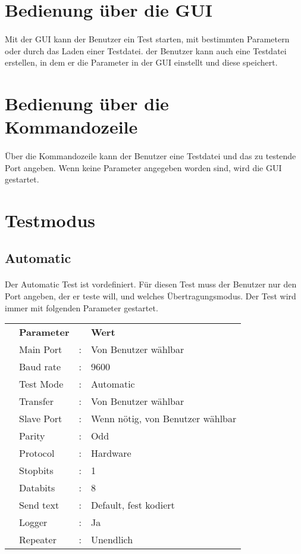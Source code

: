 \section{Bedienung über die GUI}
\paragraph{}
Mit der GUI kann der Benutzer ein Test starten, mit bestimmten Parametern oder durch das Laden einer Testdatei. der Benutzer kann auch eine Testdatei erstellen, in dem er die Parameter in der GUI einstellt und diese speichert.

\section{Bedienung über die Kommandozeile}
\paragraph{}
Über die Kommandozeile kann der Benutzer eine Testdatei und das zu testende Port angeben. Wenn keine Parameter angegeben worden sind, wird die GUI gestartet.

\section{Testmodus}

\subsection{Automatic}
\paragraph{}
Der Automatic Test ist vordefiniert. Für diesen Test muss der Benutzer nur den Port angeben, der er teste will, und welches Übertragungsmodus. Der Test wird immer mit folgenden Parameter gestartet.
\\
\begin{tabular}{llll}
\\ &\textbf{Parameter} & &\textbf{Wert}
\\ &Main Port &: &Von Benutzer wählbar
\\ &Baud rate &: &9600
\\ &Test Mode &: &Automatic
\\ &Transfer &: &Von Benutzer wählbar
\\ &Slave Port &: &Wenn nötig, von Benutzer wählbar
\\ &Parity &: &Odd
\\ &Protocol &: &Hardware
\\ &Stopbits &: &1
\\ &Databits &: &8
\\ &Send text &: &Default, fest kodiert
\\ &Logger &: &Ja
\\ &Repeater &: &Unendlich
\end{tabular}


